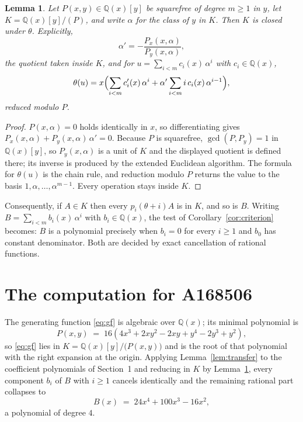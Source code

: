 \documentclass[11pt,a4paper]{article}
\theoremstyle{plain}
\newtheorem{lemma}[theorem]{Lemma}
\theoremstyle{definition}
\begin{document}
\begin{lemma}\label{lem:field}
Let $P(x,y)\in\mathbb{Q}(x)[y]$ be squarefree of degree $m\ge1$ in $y$, let
$K=\mathbb{Q}(x)[y]/(P)$, and write $\alpha$ for the class of $y$ in $K$. Then $K$ is
closed under $\theta$. Explicitly,
\[
\alpha'=-\frac{P_{x}(x,\alpha)}{P_{y}(x,\alpha)},
\]
the quotient taken inside $K$, and for $u=\sum_{i<m}c_{i}(x)\,\alpha^{i}$ with
$c_{i}\in\mathbb{Q}(x)$,
\[
\theta(u)=x\Bigl(\sum_{i<m}c_{i}'(x)\,\alpha^{i}
 +\alpha'\sum_{i<m}i\,c_{i}(x)\,\alpha^{i-1}\Bigr),
\]
reduced modulo $P$.
\end{lemma}

\begin{proof}
$P(x,\alpha)=0$ holds identically in $x$, so differentiating gives
$P_{x}(x,\alpha)+P_{y}(x,\alpha)\,\alpha'=0$. Because $P$ is squarefree,
$\gcd(P,P_{y})=1$ in $\mathbb{Q}(x)[y]$, so $P_{y}(x,\alpha)$ is a unit of $K$ and the
displayed quotient is defined there; its inverse is produced by the extended Euclidean
algorithm. The formula for $\theta(u)$ is the chain rule, and reduction modulo $P$ returns
the value to the basis $1,\alpha,\dots,\alpha^{m-1}$. Every operation stays inside $K$.
\end{proof}

Consequently, if $A\in K$ then every $p_{i}(\theta+i)A$ is in $K$, and so is $B$. Writing
$B=\sum_{i<m}b_{i}(x)\,\alpha^{i}$ with $b_{i}\in\mathbb{Q}(x)$, the test of
Corollary~\ref{cor:criterion} becomes: $B$ is a polynomial precisely when $b_{i}=0$ for
every $i\ge1$ and $b_{0}$ has constant denominator. Both are decided by exact
cancellation of rational functions.

\section{The computation for A168506}

The generating function \eqref{eq:gf} is algebraic over $\mathbb{Q}(x)$;
its minimal polynomial is
\[
P(x,y) \;=\; 16 \left(4 x^{3} + 2 x y^{2} - 2 x y + y^{4} - 2 y^{3} + y^{2}\right) ,
\]
so \eqref{eq:gf} lies in $K=\mathbb{Q}(x)[y]/\bigl(P(x,y)\bigr)$ and is the root of that polynomial with the right
expansion at the origin. Applying Lemma~\ref{lem:transfer} to the coefficient polynomials
of Section~1 and reducing in $K$ by Lemma~\ref{lem:field}, every component $b_{i}$ of $B$
with $i\ge1$ cancels identically and the remaining rational part collapses to
\[
B(x)\;=\;24 x^{4} + 100 x^{3} - 16 x^{2} ,
\]
a polynomial of degree $4$.
\end{document}
